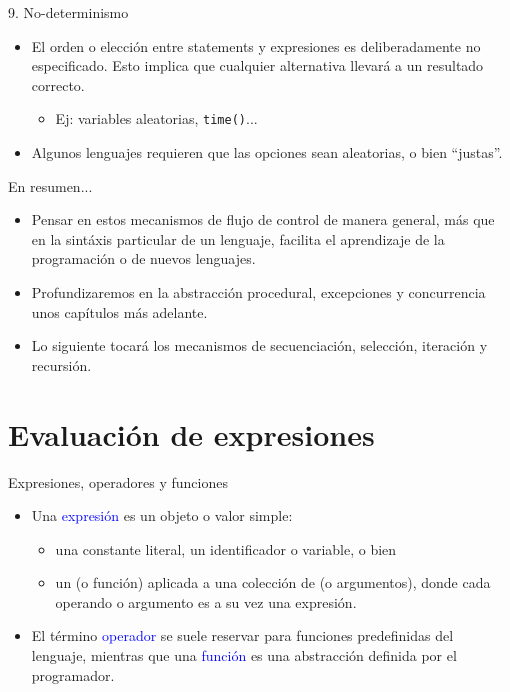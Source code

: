 \documentclass[handout]{beamer} %
\newcommand{\blue}[1]{\textcolor{blue}{#1}}
\newcommand{\redb}[1]{{\color{red!70!black}{#1}}}
\begin{document}
\begin{frame}{9. No-determinismo}
  \begin{itemize}
    \item<1-> El orden o elección entre statements y expresiones es deliberadamente no especificado. Esto implica que cualquier alternativa llevará a un resultado correcto.
    \begin{itemize}
        \item Ej: variables aleatorias, \texttt{time()}...
    \end{itemize}
    \item<1-> Algunos lenguajes requieren que las opciones sean aleatorias, o bien ``justas''.
  \end{itemize}
\end{frame}

\begin{frame}{En resumen...}
  \begin{itemize}
    \item Pensar en estos mecanismos de flujo de control de manera general, más que en la sintáxis particular de un lenguaje, facilita el aprendizaje de la programación o de nuevos lenguajes.
    \item Profundizaremos en la abstracción procedural, excepciones y concurrencia unos capítulos más adelante.
    \item Lo siguiente tocará los mecanismos de secuenciación, selección, iteración y recursión.
  \end{itemize}
\end{frame}

\section{Evaluación de expresiones}

\begin{frame}{Expresiones, operadores y funciones}
  \begin{itemize}
    \item Una \blue{expresión} es un objeto o valor simple:
    \begin{itemize}
        \item una constante literal, un identificador o variable, o bien
        \item un \redb{operador} (o función) aplicada a una colección de \redb{operandos} (o argumentos), donde cada operando o argumento es a su vez una expresión.
    \end{itemize}
    \item El término \blue{operador} se suele reservar para funciones predefinidas del lenguaje, mientras que una \blue{función} es una abstracción definida por el programador.
  \end{itemize}
\end{frame}
\end{document}

